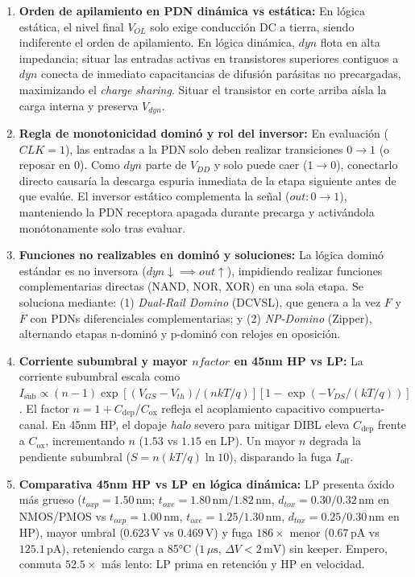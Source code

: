 \begin{enumerate}[leftmargin=1.5em,itemsep=0.04em,parsep=0pt,topsep=0.1em]
\item \textbf{Orden de apilamiento en PDN dinámica vs estática:} En lógica estática, el nivel final $V_{OL}$ solo exige conducción DC a tierra, siendo indiferente el orden de apilamiento. En lógica dinámica, $dyn$ flota en alta impedancia; situar las entradas activas en transistores superiores contiguos a $dyn$ conecta de inmediato capacitancias de difusión parásitas no precargadas, maximizando el \textit{charge sharing}. Situar el transistor en corte arriba aísla la carga interna y preserva $V_{dyn}$.

\item \textbf{Regla de monotonicidad dominó y rol del inversor:} En evaluación ($CLK=1$), las entradas a la PDN solo deben realizar transiciones $0 \to 1$ (o reposar en 0). Como $dyn$ parte de $V_{DD}$ y solo puede caer ($1 \to 0$), conectarlo directo causaría la descarga espuria inmediata de la etapa siguiente antes de que evalúe. El inversor estático complementa la señal ($out: 0 \to 1$), manteniendo la PDN receptora apagada durante precarga y activándola monótonamente solo tras evaluar.

\item \textbf{Funciones no realizables en dominó y soluciones:} La lógica dominó estándar es no inversora ($dyn \downarrow \implies out \uparrow$), impidiendo realizar funciones complementarias directas (NAND, NOR, XOR) en una sola etapa. Se soluciona mediante: (1) \textit{Dual-Rail Domino} (DCVSL), que genera a la vez $F$ y $\overline{F}$ con PDNs diferenciales complementarias; y (2) \textit{NP-Domino} (Zipper), alternando etapas n-dominó y p-dominó con relojes en oposición.

\item \textbf{Corriente subumbral y mayor $nfactor$ en 45nm HP vs LP:} La corriente subumbral escala como $I_{\text{sub}} \propto (n-1)\exp[(V_{GS}-V_{th})/(n k T/q)][1 - \exp(-V_{DS}/(kT/q))]$. El factor $n = 1 + C_{\text{dep}}/C_{\text{ox}}$ refleja el acoplamiento capacitivo compuerta-canal. En 45nm HP, el dopaje \textit{halo} severo para mitigar DIBL eleva $C_{\text{dep}}$ frente a $C_{\text{ox}}$, incrementando $n$ ($1.53$ vs $1.15$ en LP). Un mayor $n$ degrada la pendiente subumbral ($S = n(kT/q)\ln 10$), disparando la fuga $I_{\text{off}}$.

\item \textbf{Comparativa 45nm HP vs LP en lógica dinámica:} LP presenta óxido más grueso ($t_{oxp}=1.50\,\text{nm}$; $t_{oxe}=1.80\,\text{nm}/1.82\,\text{nm}$, $d_{tox}=0.30/0.32\,\text{nm}$ en NMOS/PMOS vs $t_{oxp}=1.00\,\text{nm}$, $t_{oxe}=1.25/1.30\,\text{nm}$, $d_{tox}=0.25/0.30\,\text{nm}$ en HP), mayor umbral ($0.623\,\text{V}$ vs $0.469\,\text{V}$) y fuga $186\times$ menor ($0.67\,\text{pA}$ vs $125.1\,\text{pA}$), reteniendo carga a 85°C ($1\,\mu\text{s}$, $\Delta V < 2\,\text{mV}$) sin keeper. Empero, conmuta $52.5\times$ más lento: LP prima en retención y HP en velocidad.


\end{enumerate}

